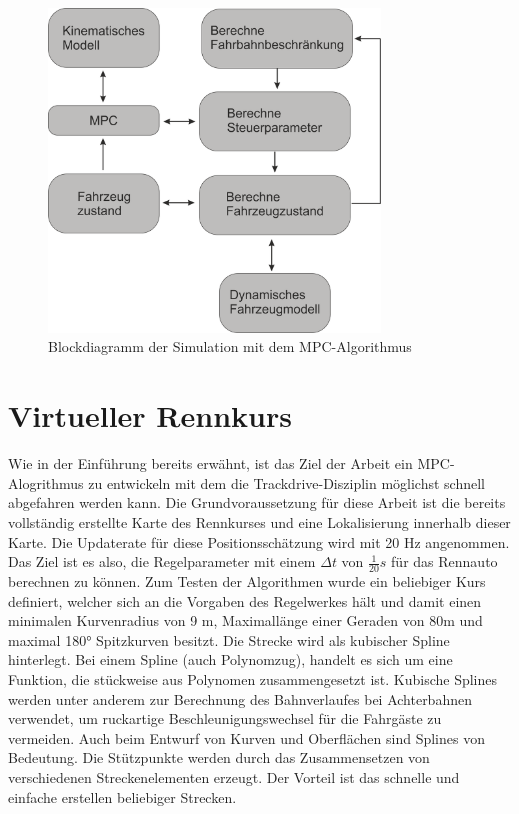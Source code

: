 \documentclass{like}
\begin{document}
\begin{figure}[ht!]
	\centering
	\includegraphics[width=250pt]{Abbildungen/MPCSimulation.png}
	\caption{Blockdiagramm der Simulation mit dem \ac{MPC}-Algorithmus}
	\label{fig:block_diagram_sim}
\end{figure}


\section{Virtueller Rennkurs}
Wie in der Einführung bereits erwähnt, ist das Ziel der Arbeit ein \ac{MPC}-Alogrithmus zu entwickeln mit dem die Trackdrive-Disziplin möglichst schnell abgefahren werden kann. Die Grundvoraussetzung für diese Arbeit ist die bereits vollständig erstellte Karte des Rennkurses und eine Lokalisierung innerhalb dieser Karte. Die Updaterate für diese Positionsschätzung wird mit 20 Hz angenommen. Das Ziel ist es also, die Regelparameter mit einem $\Delta t$ von $\frac{1}{20} s$ für das Rennauto berechnen zu können.  Zum Testen der Algorithmen wurde ein beliebiger Kurs definiert, welcher sich an die Vorgaben des Regelwerkes hält und damit einen minimalen Kurvenradius von 9 m, Maximallänge einer Geraden von 80m und maximal 180° Spitzkurven besitzt. Die Strecke wird als kubischer Spline hinterlegt. Bei einem Spline (auch Polynomzug), handelt es sich um eine Funktion, die stückweise aus Polynomen zusammengesetzt ist. Kubische Splines werden unter anderem zur Berechnung des Bahnverlaufes bei Achterbahnen verwendet, um ruckartige Beschleunigungswechsel für die Fahrgäste zu vermeiden. Auch beim Entwurf von Kurven und Oberflächen sind Splines von Bedeutung. Die Stützpunkte werden durch das Zusammensetzen von verschiedenen Streckenelementen erzeugt. Der Vorteil ist das schnelle und einfache erstellen beliebiger Strecken. 
\end{document}
